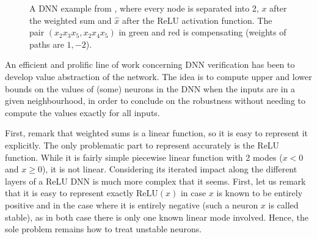 \documentclass{llncs}
\newcommand{\ReLU}{\mathrm{ReLU}}
\begin{document}
\begin{figure}[t!]
		\caption{A DNN example from \cite{kpoly}, where every node is separated into 2, $x$ after the weighted sum and $\hat{x}$ after the ReLU activation function. The pair $(x_2 x_3 x_5,x_2 x_4 x_5)$ in green and red is compensating (weights of paths are $1,-2$).}
		\label{fig1}
	\end{figure}
	
An efficient and prolific line of work concerning DNN verification has been to develop value abstraction of the network. The idea is to compute upper and lower bounds on the values of (some) neurons in the DNN when the inputs are in a given neighbourhood, in order to conclude on the robustness without needing to compute the values exactly for all inputs.

First, remark that weighted sums is a linear function, so it is easy to represent it explicitly. The only problematic part to represent accurately is the ReLU function. While it is fairly simple piecewise linear function with 2 modes ($x<0$ and $x \geq 0$), it is not linear. Considering its iterated impact along the different layers of a ReLU DNN is much more complex that it seems. First, let us remark that it is easy to represent exactly $\ReLU(x)$
in case $x$ is known to be entirely positive and in the case where it is entirely negative
(such a neuron $x$ is called stable), as in both case there is only one known linear mode involved. Hence, the sole problem remains how to treat unstable neurons.
\end{document}
